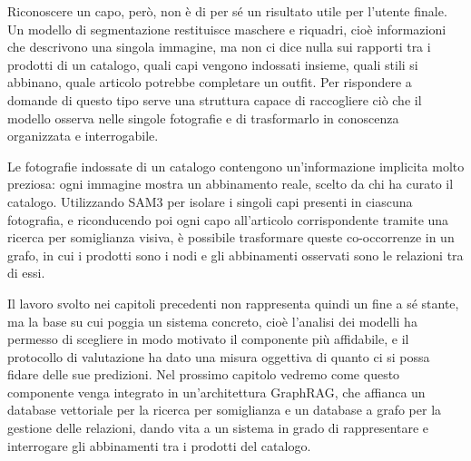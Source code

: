 Riconoscere un capo, però, non è di per sé un risultato utile per l'utente finale. Un modello di segmentazione restituisce maschere e riquadri, cioè informazioni che descrivono una singola immagine,
ma non ci dice nulla sui rapporti tra i prodotti di un catalogo, quali capi vengono indossati insieme, quali stili si abbinano, quale articolo potrebbe completare un outfit.
Per rispondere a domande di questo tipo serve una struttura capace di raccogliere ciò che il modello osserva nelle singole fotografie e di trasformarlo in conoscenza organizzata e interrogabile.

Le fotografie indossate di un catalogo contengono un'informazione implicita molto preziosa: ogni immagine mostra un abbinamento reale, scelto da chi ha curato il catalogo.
Utilizzando SAM3 per isolare i singoli capi presenti in ciascuna fotografia, e riconducendo poi ogni capo all'articolo corrispondente tramite una ricerca per somiglianza visiva, è possibile trasformare queste co-occorrenze in un grafo,
in cui i prodotti sono i nodi e gli abbinamenti osservati sono le relazioni tra di essi.

Il lavoro svolto nei capitoli precedenti non rappresenta quindi un fine a sé stante, ma la base su cui poggia un sistema concreto, cioè l'analisi dei modelli ha permesso di scegliere in modo motivato il componente più affidabile,
e il protocollo di valutazione ha dato una misura oggettiva di quanto ci si possa fidare delle sue predizioni.
Nel prossimo capitolo vedremo come questo componente venga integrato in un'architettura GraphRAG, che affianca un database vettoriale per la ricerca per somiglianza e un database a grafo per la gestione delle relazioni,
dando vita a un sistema in grado di rappresentare e interrogare gli abbinamenti tra i prodotti del catalogo.

\newpage
